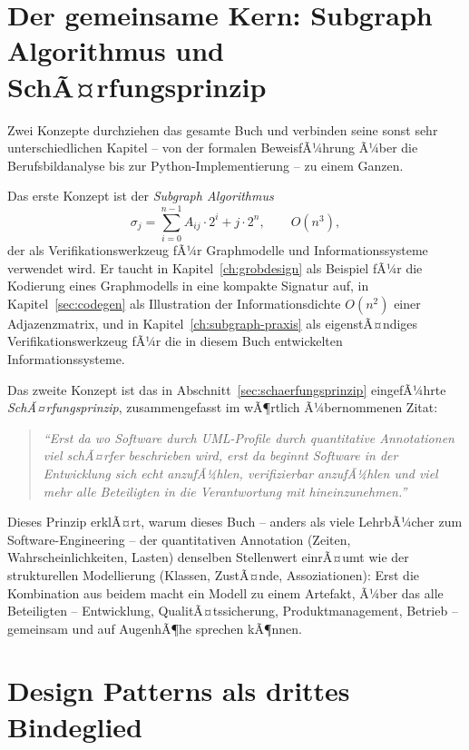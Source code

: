 ﻿\documentclass[a4paper,12pt]{report}
\theoremstyle{definition}
\begin{document}
\section*{Der gemeinsame Kern: Subgraph Algorithmus und SchÃ¤rfungsprinzip}

Zwei Konzepte durchziehen das gesamte Buch und verbinden seine sonst sehr
unterschiedlichen Kapitel -- von der formalen BeweisfÃ¼hrung Ã¼ber die
Berufsbildanalyse bis zur Python-Implementierung -- zu einem Ganzen.

Das erste Konzept ist der \emph{Subgraph Algorithmus}
\[
\sigma_j = \sum_{i=0}^{n-1} A_{ij} \cdot 2^i + j \cdot 2^n, \qquad O(n^3),
\]
der als Verifikationswerkzeug fÃ¼r Graphmodelle und Informationssysteme
verwendet wird. Er taucht in Kapitel~\ref{ch:grobdesign} als Beispiel fÃ¼r
die Kodierung eines Graphmodells in eine kompakte Signatur auf, in
Kapitel~\ref{sec:codegen} als Illustration der Informationsdichte $O(n^2)$
einer Adjazenzmatrix, und in
Kapitel~\ref{ch:subgraph-praxis} als eigenstÃ¤ndiges
Verifikationswerkzeug fÃ¼r die in diesem Buch entwickelten
Informationssysteme.

Das zweite Konzept ist das in Abschnitt~\ref{sec:schaerfungsprinzip}
eingefÃ¼hrte \emph{SchÃ¤rfungsprinzip}, zusammengefasst im wÃ¶rtlich
Ã¼bernommenen Zitat:
\begin{quotation}
\noindent\textit{%
``Erst da wo Software durch UML-Profile durch quantitative Annotationen
viel schÃ¤rfer beschrieben wird, erst da beginnt Software in der Entwicklung
sich echt anzufÃ¼hlen, verifizierbar anzufÃ¼hlen und viel mehr alle
Beteiligten in die Verantwortung mit hineinzunehmen.''
}
\end{quotation}
Dieses Prinzip erklÃ¤rt, warum dieses Buch -- anders als viele LehrbÃ¼cher
zum Software-Engineering -- der quantitativen Annotation (Zeiten,
Wahrscheinlichkeiten, Lasten) denselben Stellenwert einrÃ¤umt wie der
strukturellen Modellierung (Klassen, ZustÃ¤nde, Assoziationen): Erst die
Kombination aus beidem macht ein Modell zu einem Artefakt, Ã¼ber das alle
Beteiligten -- Entwicklung, QualitÃ¤tssicherung, Produktmanagement, Betrieb
-- gemeinsam und auf AugenhÃ¶he sprechen kÃ¶nnen.

\section*{Design Patterns als drittes Bindeglied}
\end{document}
